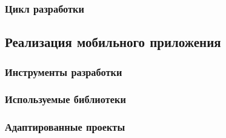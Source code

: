\subsubsection{Цикл разработки}



\subsection{Реализация мобильного приложения}
\subsubsection{Инструменты разработки}
\subsubsection{Используемые библиотеки}
\subsubsection{Адаптированные проекты}